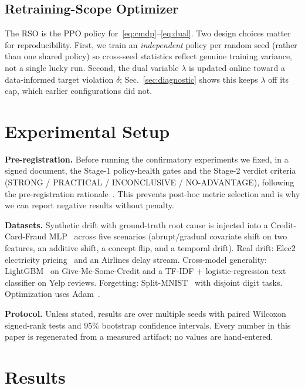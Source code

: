 \documentclass[conference]{IEEEtran}
\begin{document}
\subsection{Retraining-Scope Optimizer}\label{sec:rso}
The RSO is the PPO policy for~\eqref{eq:cmdp}--\eqref{eq:dual}. Two design
choices matter for reproducibility. First, we train an \emph{independent}
policy per random seed (rather than one shared policy) so cross-seed
statistics reflect genuine training variance, not a single lucky run.
Second, the dual variable $\lambda$ is updated online toward a data-informed
target violation $\delta$; Sec.~\ref{sec:diagnostic} shows this keeps
$\lambda$ off its cap, which earlier configurations did not.

\section{Experimental Setup}\label{sec:setup}
\textbf{Pre-registration.} Before running the confirmatory experiments we
fixed, in a signed document, the Stage-1 policy-health gates and the
Stage-2 verdict criteria (STRONG / PRACTICAL / INCONCLUSIVE /
NO-ADVANTAGE), following the pre-registration
rationale~\cite{nosek2018preregistration,pineau2021reproducibility}. This
prevents post-hoc metric selection and is why we can report negative
results without penalty.

\textbf{Datasets.} Synthetic drift with ground-truth root cause is
injected into a Credit-Card-Fraud MLP~\cite{dalpozzolo2015calibrating}
across five scenarios (abrupt/gradual covariate shift on two features,
an additive shift, a concept flip, and a temporal drift). Real drift:
Elec2 electricity pricing~\cite{harries1999splice} and an Airlines
delay stream. Cross-model generality: LightGBM~\cite{ke2017lightgbm} on
Give-Me-Some-Credit and a TF-IDF + logistic-regression text classifier on
Yelp reviews. Forgetting: Split-MNIST~\cite{lecun1998mnist} with disjoint
digit tasks. Optimization uses Adam~\cite{kingma2015adam}.

\textbf{Protocol.} Unless stated, results are over multiple seeds with
paired Wilcoxon signed-rank tests and $95\%$ bootstrap confidence
intervals. Every number in this paper is regenerated from a measured
artifact; no values are hand-entered.

\section{Results}\label{sec:results}
\end{document}
